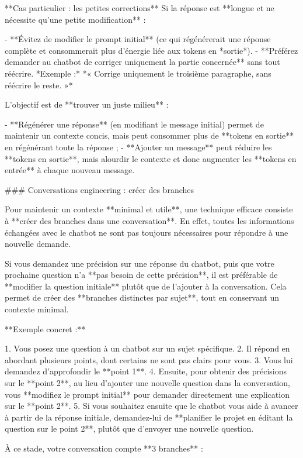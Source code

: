 **Cas particulier : les petites corrections**
Si la réponse est **longue et ne nécessite qu'une petite modification** :

- **Évitez de modifier le prompt initial** (ce qui régénérerait une réponse complète et consommerait plus d'énergie liée aux tokens en *sortie*).
- **Préférez demander au chatbot de corriger uniquement la partie concernée** sans tout réécrire.
  *Exemple :* *« Corrige uniquement le troisième paragraphe, sans réécrire le reste. »*

L'objectif est de **trouver un juste milieu** :

- **Régénérer une réponse** (en modifiant le message initial) permet de maintenir un contexte concis, mais peut consommer plus de **tokens en sortie** en régénérant toute la réponse ;
- **Ajouter un message** peut réduire les **tokens en sortie**, mais alourdir le contexte et donc augmenter les **tokens en entrée** à chaque nouveau message.

### Conversations engineering : créer des branches

Pour maintenir un contexte **minimal et utile**, une technique efficace consiste à **créer des branches dans une conversation**.
En effet, toutes les informations échangées avec le chatbot ne sont pas toujours nécessaires pour répondre à une nouvelle demande.

Si vous demandez une précision sur une réponse du chatbot, puis que votre prochaine question n'a **pas besoin de cette précision**, il est préférable de **modifier la question initiale** plutôt que de l'ajouter à la conversation. Cela permet de créer des **branches distinctes par sujet**, tout en conservant un contexte minimal.

**Exemple concret :**

1. Vous posez une question à un chatbot sur un sujet spécifique.
2. Il répond en abordant plusieurs points, dont certains ne sont pas clairs pour vous.
3. Vous lui demandez d'approfondir le **point 1**.
4. Ensuite, pour obtenir des précisions sur le **point 2**, au lieu d'ajouter une nouvelle question dans la conversation, vous **modifiez le prompt initial** pour demander directement une explication sur le **point 2**.
5. Si vous souhaitez ensuite que le chatbot vous aide à avancer à partir de la réponse initiale, demandez-lui de **planifier le projet en éditant la question sur le point 2**, plutôt que d'envoyer une nouvelle question.

À ce stade, votre conversation compte **3 branches** :

